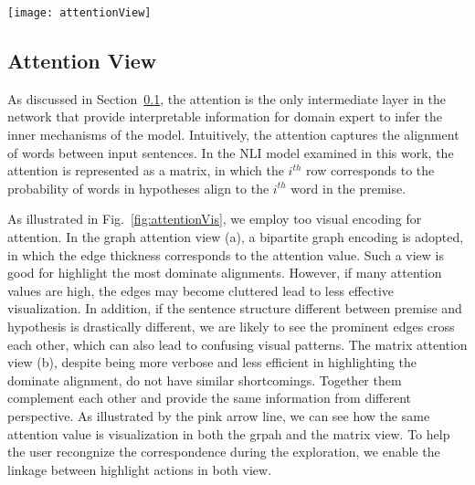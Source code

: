 \begin{figure*}[t]
\centering
\vspace{-2mm}
\texttt{[image: attentionView]}
\vspace{-6mm}
\caption{
Attention visualization. In the graph attention view (a), a bipartite graph encoding is adopted, in which the edge thickness corresponds to the attention value. In the matrix attention view (b), the $i^{th}$ row corresponds to the probability of words in hypotheses align to the $i^{th}$ word in the premise.
The user can alter the attention values via the pop up interface illustrated in (c).
}
\label{fig:attentionVis}
\end{figure*}

\subsection{Attention View}
\label{sec:attention}
As discussed in Section~\ref{sec:attention}, the attention is the only intermediate layer in the network that provide interpretable information for domain expert to infer the inner mechanisms of the model.
%
Intuitively, the attention captures the alignment of words between input sentences. In the NLI model examined in this work, the attention is represented as a matrix, in which the $i^{th}$ row corresponds to the probability of words in hypotheses align to the $i^{th}$ word in the premise.

As illustrated in Fig.~\ref{fig:attentionVis}, we employ too visual encoding for attention. In the graph attention view (a), a bipartite graph encoding is adopted, in which the edge thickness corresponds to the attention value. Such a view is good for highlight the most dominate alignments. However, if many attention values are high, the edges may become cluttered lead to less effective visualization. In addition, if the sentence structure different between premise and hypothesis is drastically different, we are likely to see the prominent edges cross each other, which can also lead to confusing visual patterns. The matrix attention view (b), despite being more verbose and less efficient in highlighting the dominate alignment, do not have similar shortcomings. Together them complement each other and provide the same information from different perspective. As illustrated by the pink arrow line, we can see how the same attention value is visualization in both the grpah and the matrix view.
To help the user recongnize the correspondence during the exploration, we enable the linkage between highlight actions in both view.

